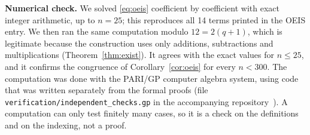 \documentclass[11pt,a4paper]{article}
\theoremstyle{definition}
\theoremstyle{remark}
\newcommand{\para}[1]{\par\medskip\noindent\textbf{#1}\enspace}
\begin{document}
\para{Numerical check.}
We solved \eqref{eq:oeis} coefficient by coefficient with exact integer arithmetic, up to $n=25$; this
reproduces all 14 terms printed in the OEIS entry. We then ran the same computation
modulo $12=2(q+1)$, which is legitimate because the construction uses only additions,
subtractions and multiplications (Theorem~\ref{thm:exist}). It agrees with the exact values for $n\le25$, and it confirms
the congruence of Corollary~\ref{cor:oeis} for every $n<300$.
The computation was done with the PARI/GP computer algebra system, using code that was written separately from the
formal proofs (file \texttt{verification/independent\_checks.gp} in the accompanying repository~\cite{repo}).
A computation can only test finitely many cases, so it is a check on the definitions and on the indexing, not a proof.
\end{document}
